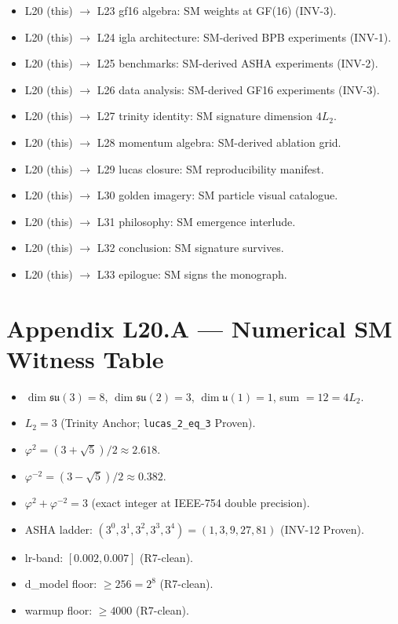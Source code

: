 \begin{itemize}
  \item L20 (this) $\to$ L23 gf16 algebra: SM weights at GF(16) (INV-3).
  \item L20 (this) $\to$ L24 igla architecture: SM-derived BPB experiments (INV-1).
  \item L20 (this) $\to$ L25 benchmarks: SM-derived ASHA experiments (INV-2).
  \item L20 (this) $\to$ L26 data analysis: SM-derived GF16 experiments (INV-3).
  \item L20 (this) $\to$ L27 trinity identity: SM signature dimension $4 L_{2}$.
  \item L20 (this) $\to$ L28 momentum algebra: SM-derived ablation grid.
  \item L20 (this) $\to$ L29 lucas closure: SM reproducibility manifest.
  \item L20 (this) $\to$ L30 golden imagery: SM particle visual catalogue.
  \item L20 (this) $\to$ L31 philosophy: SM emergence interlude.
  \item L20 (this) $\to$ L32 conclusion: SM signature survives.
  \item L20 (this) $\to$ L33 epilogue: SM signs the monograph.
\end{itemize}

\section{Appendix L20.A — Numerical SM Witness Table}
\label{sec:l20-appendix-A}

\begin{itemize}
  \item $\dim \mathfrak{su}(3) = 8$, $\dim \mathfrak{su}(2) = 3$, $\dim \mathfrak{u}(1) = 1$, sum $= 12 = 4 L_{2}$.
  \item $L_{2} = 3$ (Trinity Anchor; \texttt{lucas\_2\_eq\_3} Proven).
  \item $\varphi^{2} = (3 + \sqrt 5)/2 \approx 2.618$.
  \item $\varphi^{-2} = (3 - \sqrt 5)/2 \approx 0.382$.
  \item $\varphi^{2} + \varphi^{-2} = 3$ (exact integer at IEEE-754 double precision).
  \item ASHA ladder: $(3^{0}, 3^{1}, 3^{2}, 3^{3}, 3^{4}) = (1, 3, 9, 27, 81)$ (INV-12 Proven).
  \item lr-band: $[0.002, 0.007]$ (R7-clean).
  \item d\_model floor: $\geq 256 = 2^{8}$ (R7-clean).
  \item warmup floor: $\geq 4000$ (R7-clean).
\end{itemize}

